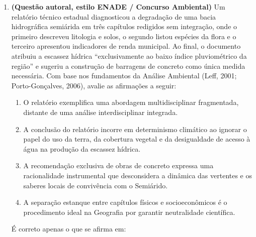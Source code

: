 
\begin{enumerate}[leftmargin=1.8em, itemsep=5pt, start=16]
  \item \textbf{(Questão autoral, estilo ENADE / Concurso Ambiental)} Um relatório técnico estadual diagnosticou a degradação de uma bacia hidrográfica semiárida em três capítulos redigidos sem integração, onde o primeiro descreveu litologia e solos, o segundo listou espécies da flora e o terceiro apresentou indicadores de renda municipal. Ao final, o documento atribuiu a escassez hídrica ``exclusivamente ao baixo índice pluviométrico da região'' e sugeriu a construção de barragens de concreto como única medida necessária. Com base nos fundamentos da Análise Ambiental (Leff, 2001; Porto-Gonçalves, 2006), avalie as afirmações a seguir:
  \begin{enumerate}[label=\Roman*., leftmargin=1.6em, itemsep=1.5pt]
    \item O relatório exemplifica uma abordagem multidisciplinar fragmentada, distante de uma análise interdisciplinar integrada.
    \item A conclusão do relatório incorre em determinismo climático ao ignorar o papel do uso da terra, da cobertura vegetal e da desigualdade de acesso à água na produção da escassez hídrica.
    \item A recomendação exclusiva de obras de concreto expressa uma racionalidade instrumental que desconsidera a dinâmica das vertentes e os saberes locais de convivência com o Semiárido.
    \item A separação estanque entre capítulos físicos e socioeconômicos é o procedimento ideal na Geografia por garantir neutralidade científica.
  \end{enumerate}
  É correto apenas o que se afirma em:
  \espacoResolucao[1.8cm]


\end{enumerate}
